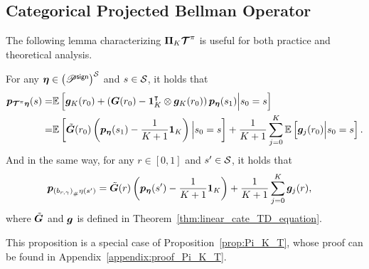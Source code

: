 \subsection{Categorical Projected Bellman Operator}
The following lemma characterizing $\bm{\Pi}_K\bm{\mathcal{T}}^\pi$ is useful for both practice and theoretical analysis.
\begin{proposition}\label{prop:categorical_projection_operator}
For any ${\bm{\eta}}\in\left({{\mathscr{P}}^{\mathsf{sign}}}\right)^{\mathcal{S}}$ and $s\in{\mathcal{S}}$, it holds that
\begin{equation*}
\begin{aligned}
     {\bm{p}}_{\bm{\mathcal{T}}^\pi\bm{\eta}}(s)=&{\mathbb E}\left[{{\bm{g}}_K(r_0)+\left({{\bm{G}}(r_0)-\bm{1}_K^{\intercal}\otimes{\bm{g}}_K(r_0)}\right)  {\bm{p}}_{\bm{\eta}}(s_1)  \Big| s_0=s }\right]\\
     =&{\mathbb E}\left[{\tilde{{\bm{G}}}(r_0) \left({{\bm{p}}_{\bm{\eta}}(s_1)-\frac{1}{K+1}\bm{1}_{K}}\right)  \Big| s_0=s }\right]+\frac{1}{K+1}\sum_{j=0}^K{\mathbb E}\left[{{\bm{g}}_j(r_0) \Big| s_0=s }\right].
\end{aligned}
\end{equation*}
And in the same way, for any $r\in[0,1]$ and $s^\prime\in{\mathcal{S}}$, it holds that
\begin{equation*}
\begin{aligned}
{\bm{p}}_{\left({b_{r,\gamma}}\right)_\#{\eta}(s^\prime)}&=\tilde{{\bm{G}}}(r) \left({{\bm{p}}_{\bm{\eta}}(s^\prime)-\frac{1}{K+1}\bm{1}_{K}}\right)  +\frac{1}{K+1}\sum_{j=0}^K{\bm{g}}_j(r),
\end{aligned}
\end{equation*}
    where $\tilde{{\bm{G}}}$ and ${\bm{g}}$ is defined in Theorem~\ref{thm:linear_cate_TD_equation}.
\end{proposition}
This proposition is a special case of Proposition~\ref{prop:Pi_K_T}, whose proof can be found in Appendix~\ref{appendix:proof_Pi_K_T}.